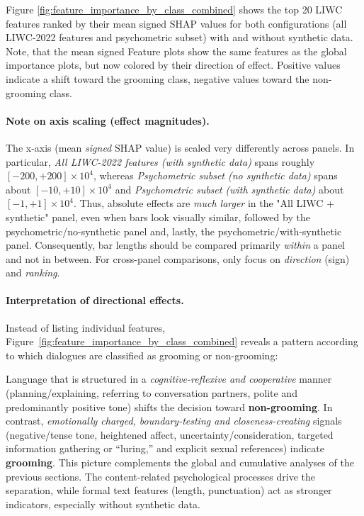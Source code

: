 Figure \ref{fig:feature_importance_by_class_combined} shows the top 20 LIWC features ranked by their mean signed SHAP values for both configurations (all LIWC-2022 features and psychometric subset) with and without synthetic data. Note, that the mean signed Feature plots show the same features as the global importance plots, but now colored by their direction of effect. Positive values indicate a shift toward the grooming class, negative values toward the non-grooming class. 

\paragraph{Note on axis scaling (effect magnitudes).}
The x-axis (mean \emph{signed} SHAP value) is scaled very differently across panels. In particular, \emph{All LIWC-2022 features (with synthetic data)} spans roughly $[-200,+200]\times 10^{4}$, whereas \emph{Psychometric subset (no synthetic data)} spans about $[-10,+10]\times 10^{4}$ and \emph{Psychometric subset (with synthetic data)} about $[-1,+1]\times 10^{4}$. 
Thus, absolute effects are \emph{much larger} in the "All LIWC + synthetic" panel, even when bars look visually similar, followed by the psychometric/no-synthetic panel and, lastly, the psychometric/with-synthetic panel. 
Consequently, bar lengths should be compared primarily \emph{within} a panel and not in between. For cross-panel comparisons, only focus on \emph{direction} (sign) and \emph{ranking}.

\paragraph{Interpretation of directional effects.}
Instead of listing individual features, Figure~\ref{fig:feature_importance_by_class_combined} reveals a pattern according to which dialogues are classified as grooming or non-grooming:
 
Language that is structured in a \emph{cognitive-reflexive and cooperative} manner (planning/explaining, referring to conversation partners, polite and predominantly positive tone) shifts the decision toward \textbf{non-grooming}. In contrast, \emph{emotionally charged, boundary-testing and closeness-creating} signals (negative/tense tone, heightened affect, uncertainty/consideration, targeted information gathering or “luring,” and explicit sexual references) indicate \textbf{grooming}. This picture complements the global and cumulative analyses of the previous sections. The content-related psychological processes drive the separation, while formal text features (length, punctuation) act as stronger indicators, especially without synthetic data.


